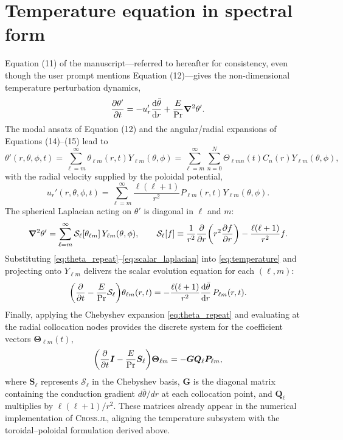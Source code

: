 \documentclass[11pt]{article}
\numberwithin{equation}{section}
\begin{document}
\section{Temperature equation in spectral form}
Equation (11) of the manuscript---referred to hereafter for consistency, even though the user prompt mentions Equation (12)---gives the non-dimensional temperature perturbation dynamics,
\begin{equation}
  \pdv{\theta'}{t} = - u_r' \dv{\bar{\theta}}{r} + \frac{E}{\mathrm{Pr}} \grad^2 \theta'.
  \label{eq:temperature}
\end{equation}
The modal ansatz of Equation (12) and the angular/radial expansions of Equations (14)--(15) lead to
\begin{equation}
  \theta'(r,\theta,\phi,t) = \sum_{\ell=m}^{\infty} \theta_{\ell m}(r,t) Y_{\ell m}(\theta,\phi)
  = \sum_{\ell=m}^{\infty} \sum_{n=0}^{N} \Theta_{\ell m n}(t) C_n(r) Y_{\ell m}(\theta,\phi),
  \label{eq:theta_repeat}
\end{equation}
with the radial velocity supplied by the poloidal potential,
\begin{equation}
  u_r'(r,\theta,\phi,t) = \sum_{\ell=m}^{\infty} \frac{\ell(\ell+1)}{r^2} P_{\ell m}(r,t) Y_{\ell m}(\theta,\phi).
  \label{eq:ur_repeat}
\end{equation}
The spherical Laplacian acting on $\theta'$ is diagonal in $\ell$ and $m$:
\begin{equation}
  \grad^2 \theta' = \sum_{\ell=m}^{\infty} \mathcal{S}_\ell[\theta_{\ell m}] \, Y_{\ell m}(\theta,\phi),
  \qquad
  \mathcal{S}_\ell[f] \equiv \frac{1}{r^2} \pdv{}{r} \qty( r^2 \pdv{f}{r} ) - \frac{\ell(\ell+1)}{r^2} f.
  \label{eq:scalar_laplacian}
\end{equation}
Substituting \eqref{eq:theta_repeat}--\eqref{eq:scalar_laplacian} into \eqref{eq:temperature} and projecting onto $Y_{\ell m}$ delivers the scalar evolution equation for each $(\ell,m)$:
\begin{equation}
  \qty( \pdv{}{t} - \frac{E}{\mathrm{Pr}} \mathcal{S}_\ell ) \theta_{\ell m}(r,t)
  = - \frac{\ell(\ell+1)}{r^2} \dv{\bar{\theta}}{r} \, P_{\ell m}(r,t).
  \label{eq:temperature_modal}
\end{equation}
Finally, applying the Chebyshev expansion \eqref{eq:theta_repeat} and evaluating at the radial collocation nodes provides the discrete system for the coefficient vectors $\bm{\Theta}_{\ell m}(t)$,
\begin{equation}
  \qty( \pdv{}{t} \bm{I} - \frac{E}{\mathrm{Pr}} \bm{S}_\ell ) \bm{\Theta}_{\ell m}
  = - \bm{G} \bm{Q}_\ell \bm{P}_{\ell m},
  \label{eq:temperature_discrete}
\end{equation}
where $\bm{S}_\ell$ represents $\mathcal{S}_\ell$ in the Chebyshev basis, $\bm{G}$ is the diagonal matrix containing the conduction gradient $d\bar{\theta}/dr$ at each collocation point, and $\bm{Q}_\ell$ multiplies by $\ell(\ell+1)/r^2$. These matrices already appear in the numerical implementation of \textsc{Cross.jl}, aligning the temperature subsystem with the toroidal--poloidal formulation derived above.
\end{document}
